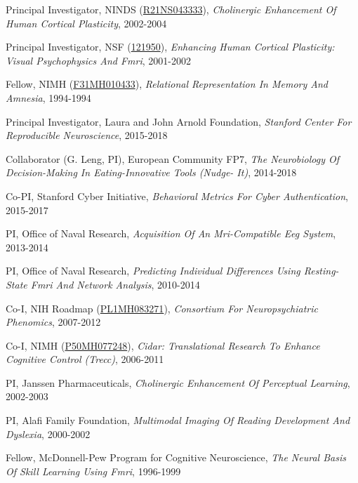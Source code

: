 Principal Investigator, NINDS (\href{http://projectreporter.nih.gov/project_info_description.cfm?aid=6623403}{R21NS043333}), \textit{Cholinergic Enhancement Of Human Cortical Plasticity}, 2002-2004 \vspace{2mm}

Principal Investigator, NSF (\href{http://grants.uberresearch.com/100000001/0121950/Enhancing-Human-Cortical-Plasticity-Visual-Psychophysics-and-fMRI}{121950}), \textit{Enhancing Human Cortical Plasticity: Visual Psychophysics And Fmri}, 2001-2002 \vspace{2mm}

Fellow, NIMH (\href{http://projectreporter.nih.gov/project_info_description.cfm?aid=2241597}{F31MH010433}), \textit{Relational Representation In Memory And Amnesia}, 1994-1994 \vspace{2mm}

Principal Investigator, Laura and John Arnold Foundation, \textit{Stanford Center For Reproducible Neuroscience}, 2015-2018 \vspace{2mm}

Collaborator (G. Leng, PI), European Community FP7, \textit{The Neurobiology Of Decision-Making In Eating-Innovative Tools (Nudge- It)}, 2014-2018 \vspace{2mm}

Co-PI, Stanford Cyber Initiative, \textit{Behavioral Metrics For Cyber Authentication}, 2015-2017 \vspace{2mm}

PI, Office of Naval Research, \textit{Acquisition Of An Mri-Compatible Eeg System}, 2013-2014 \vspace{2mm}

PI, Office of Naval Research, \textit{Predicting Individual Differences Using Resting-State Fmri And Network Analysis}, 2010-2014 \vspace{2mm}

Co-I, NIH Roadmap (\href{https://projectreporter.nih.gov/project_info_description.cfm?aid=7650594}{PL1MH083271}), \textit{Consortium For Neuropsychiatric Phenomics}, 2007-2012 \vspace{2mm}

Co-I, NIMH (\href{https://projectreporter.nih.gov/project_info_description.cfm?aid=7480935}{P50MH077248}), \textit{Cidar: Translational Research To Enhance Cognitive Control (Trecc)}, 2006-2011 \vspace{2mm}

PI, Janssen Pharmaceuticals, \textit{Cholinergic Enhancement Of Perceptual Learning}, 2002-2003 \vspace{2mm}

PI, Alafi Family Foundation, \textit{Multimodal Imaging Of Reading Development And Dyslexia}, 2000-2002 \vspace{2mm}

Fellow, McDonnell-Pew Program for Cognitive Neuroscience, \textit{The Neural Basis Of Skill Learning Using Fmri}, 1996-1999 \vspace{2mm}


